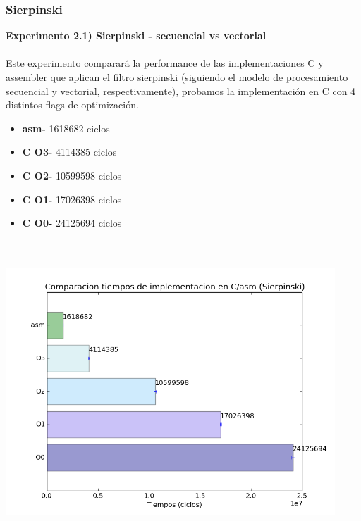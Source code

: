 \documentclass[a4paper]{article}
\begin{document}
\subsubsection{Sierpinski}

\textbf{Experimento 2.1) Sierpinski - secuencial vs vectorial}\\ \\

Este experimento comparar\'{a} la performance de las implementaciones C y assembler que aplican el filtro sierpinski (siguiendo el modelo de procesamiento secuencial y vectorial, respectivamente), probamos la implementaci\'{o}n en C con 4 distintos flags de optimizaci\'{o}n.

\begin{itemize}


\item \textbf{asm-} 1618682 ciclos\\
\item \textbf{C O3-} 4114385  ciclos\\
\item \textbf{C O2-} 10599598 ciclos\\
\item \textbf{C O1-} 17026398 ciclos\\
\item \textbf{C O0-} 24125694 ciclos\\ \\ \\

\end{itemize}

\includegraphics[width=350pt]{imagenes/CompCasm2.png}
\end{document}
